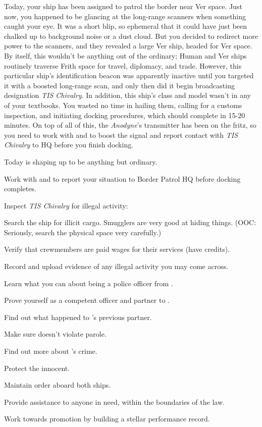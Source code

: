 \documentclass[char]{guildcamp4}
\begin{document}
Today, your ship has been assigned to patrol the border near Ver space. Just now, you happened to be glancing at the long-range scanners when something caught your eye. It was a short blip, so ephemeral that it could have just been chalked up to background noise or a dust cloud. But you decided to redirect more power to the scanners, and they revealed a large Ver ship, headed for Ver space. By itself, this wouldn't be anything out of the ordinary; Human and Ver ships routinely traverse Frith space for travel, diplomacy, and trade. However, this particular ship's identification beacon was apparently inactive until you targeted it with a boosted long-range scan, and only then did it begin broadcasting designation \emph{TIS Chivalry}. In addition, this ship's class and model wasn't in any of your textbooks. You wasted no time in hailing them, calling for a customs inspection, and initiating docking procedures, which should complete in 15-20 minutes. On top of all of this, the \emph{Anodyne}'s transmitter has been on the fritz, so you need to work with \cCbad{} and \cPilot{} to boost the signal and report contact with \emph{TIS Chivalry} to HQ before you finish docking.

Today is shaping up to be anything but ordinary.

\begin{itemz}[Goals]
	\item Work with \cCbad{} and \cPilot{} to report your situation to Border Patrol HQ before docking completes.
	\item Inspect \emph{TIS Chivalry} for illegal activity:
	\begin{itemz}
		\item Search the ship for illicit cargo. Smugglers are very good at hiding things. (OOC: Seriously, search the physical space very carefully.)
		\item Verify that crewmembers are paid wages for their services (have credits).
	\end{itemz}
	\item Record and upload evidence of any illegal activity you may come across.
	\item Learn what you can about being a police officer from \cCbad{}.
	\item Prove yourself as a competent officer and partner to \cCbad{}.
	\item Find out what happened to \cCbad{}'s previous partner.
	\item Make sure \cPilot{} doesn't violate \cPilot{\their} parole. 
	\item Find out more about \cPilot{}'s crime.
	\item Protect the innocent.
	\item Maintain order aboard both ships.
	\item Provide assistance to anyone in need, within the boundaries of the law. 
	\item Work towards promotion by building a stellar performance record.
\end{itemz}
\end{document}
